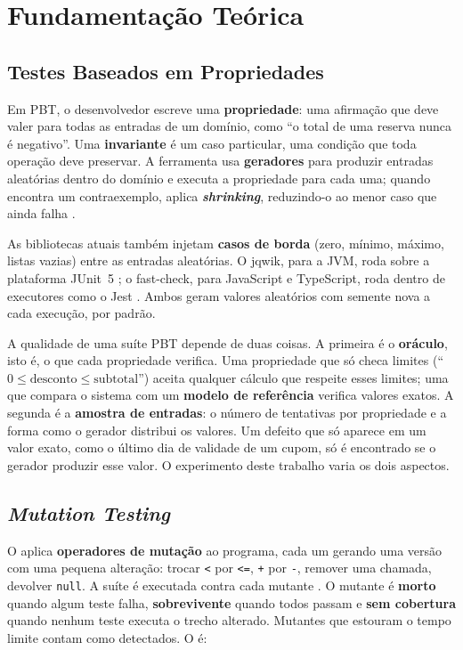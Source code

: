 \section{Fundamentação Teórica}

\subsection{Testes Baseados em Propriedades}

Em PBT, o desenvolvedor escreve uma \textbf{propriedade}: uma afirmação que deve valer para todas as entradas de um domínio, como ``o total de uma reserva nunca é negativo''. Uma \textbf{invariante} é um caso particular, uma condição que toda operação deve preservar. A ferramenta usa \textbf{geradores} para produzir entradas aleatórias dentro do domínio e executa a propriedade para cada uma; quando encontra um contraexemplo, aplica \textbf{\textit{shrinking}}, reduzindo-o ao menor caso que ainda falha \citep{claessen2000quickcheck}.

As bibliotecas atuais também injetam \textbf{casos de borda} (zero, mínimo, máximo, listas vazias) entre as entradas aleatórias. O jqwik, para a JVM, roda sobre a plataforma JUnit~5 \citep{jqwik2026}; o fast-check, para JavaScript e TypeScript, roda dentro de executores como o Jest \citep{fastcheck2026}. Ambos geram valores aleatórios com semente nova a cada execução, por padrão.

A qualidade de uma suíte PBT depende de duas coisas. A primeira é o \textbf{oráculo}, isto é, o que cada propriedade verifica. Uma propriedade que só checa limites (``$0 \le \text{desconto} \le \text{subtotal}$'') aceita qualquer cálculo que respeite esses limites; uma que compara o sistema com um \textbf{modelo de referência} verifica valores exatos. A segunda é a \textbf{amostra de entradas}: o número de tentativas por propriedade e a forma como o gerador distribui os valores. Um defeito que só aparece em um valor exato, como o último dia de validade de um cupom, só é encontrado se o gerador produzir esse valor. O experimento deste trabalho varia os dois aspectos.

\subsection{\textit{Mutation Testing}}

O \MT{} aplica \textbf{operadores de mutação} ao programa, cada um gerando uma versão com uma pequena alteração: trocar \texttt{<} por \texttt{<=}, \texttt{+} por \texttt{-}, remover uma chamada, devolver \texttt{null}. A suíte é executada contra cada mutante \citep{jia2011mutation}. O mutante é \textbf{morto} quando algum teste falha, \textbf{sobrevivente} quando todos passam e \textbf{sem cobertura} quando nenhum teste executa o trecho alterado. Mutantes que estouram o tempo limite contam como detectados. O \ms{} é:

